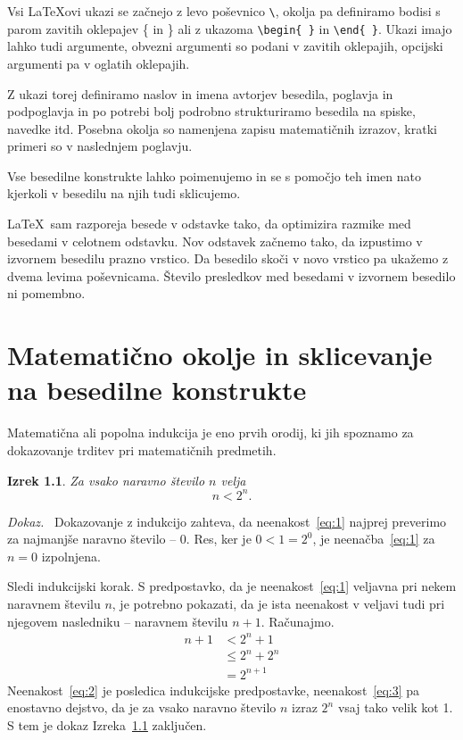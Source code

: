 \documentclass[a4paper, 12pt]{book}
\newtheorem{izrek}{Izrek}[chapter]
\newenvironment{dokaz}{\emph{Dokaz.}\ }{\hspace{\fill}{$\Box$}}
\begin{document}
Vsi \LaTeX ovi ukazi se začnejo z levo poševnico  \verb=\=, okolja pa definiramo bodisi s parom zavitih oklepajev \{ in \} ali z ukazoma \verb=\begin{ }= in   \verb=\end{ }=.
Ukazi imajo lahko tudi argumente, obvezni argumenti so podani v zavitih oklepajih, opcijski argumenti pa v oglatih oklepajih.

Z ukazi torej definiramo naslov in imena avtorjev besedila, poglavja in podpoglavja in po potrebi bolj podrobno strukturiramo besedila na spiske, navedke itd.
Posebna okolja so namenjena zapisu matematičnih izrazov, kratki primeri so v naslednjem poglavju.

Vse besedilne konstrukte lahko poimenujemo in se s pomočjo teh imen nato  kjerkoli v besedilu na njih  tudi sklicujemo.

\LaTeX\ sam razporeja besede v odstavke tako, da optimizira razmike med besedami v celotnem odstavku.
Nov odstavek začnemo tako, da izpustimo v izvornem besedilu prazno vrstico. Da besedilo skoči v novo vrstico pa ukažemo z dvema levima poševnicama.
Število presledkov med besedami v izvornem besedilo ni pomembno.


\chapter{Matematično okolje in sklicevanje na besedilne konstrukte}
\label{ch1}



Matematična ali popolna indukcija je eno prvih orodij, ki jih spoznamo za dokazovanje trditev pri matematičnih predmetih.
\begin{izrek}
\label{iz:1}
Za vsako naravno število $n$ velja
\begin{equation}
n < 2^n.
\label{eq:1}
\end{equation}
\end{izrek}
\begin{dokaz}
Dokazovanje z indukcijo zahteva, da neenakost~\eqref{eq:1} najprej preverimo za najmanjše naravno število -- $0$. 
Res, ker je $0 < 1 = 2^0$, je neenačba~\eqref{eq:1} za $n=0$ izpolnjena.

Sledi indukcijski korak. S predpostavko, da je neenakost~\eqref{eq:1} veljavna pri nekem naravnem številu $n$, je potrebno pokazati, da je ista neenakost v veljavi tudi pri njegovem nasledniku -- naravnem številu $n+1$. 
Računajmo.
\begin{align}
n+1 & < 2^n + 1       \label{eq:2}\\
       & \le 2^n + 2^n \label{eq:3}\\
       & = 2^{n+1}       \nonumber
\end{align}
Neenakost~\eqref{eq:2} je posledica indukcijske predpostavke, neenakost~\eqref{eq:3} pa enostavno dejstvo, da je za vsako naravno število $n$ izraz $2^n$ vsaj tako velik kot 1. 
S tem je dokaz Izreka~\ref{iz:1} zaključen.
\end{dokaz}
\end{document}
